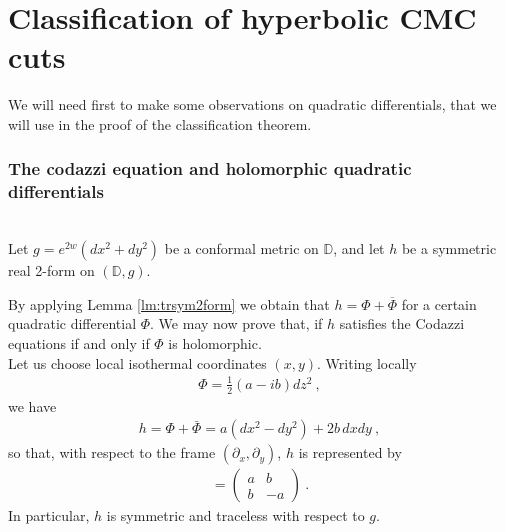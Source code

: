 \documentclass[a4paper,11pt,openright,twoside]{book}
\newcommand{\1}{\mathds{1}}
\theoremstyle{plain}
\theoremstyle{definition}
\theoremstyle{remark}
\begin{document}
\chapter{Classification of hyperbolic CMC cuts}
We will need first to make some observations on quadratic differentials, that we will use in the proof of the classification theorem.
\subsection{The codazzi equation and holomorphic quadratic differentials}\mbox{}\\
Let $g=e^{2w}(dx^2+dy^2)$ be a conformal metric on $\mathbb{D}$, and let $h$ be a symmetric real 2-form on $(\mathbb{D},g)$. 

By applying Lemma \ref{lm:trsym2form} we obtain that $h = \Phi+\overline{\Phi}$ for a certain quadratic differential $\Phi$. We may now prove that, if  $h$ satisfies the Codazzi equations if and only if $\Phi$ is holomorphic.\\

Let us choose local isothermal coordinates $(x,y)$. Writing locally
\begin{align*}
	\Phi = \tfrac{1}{2}(a-ib)dz^2
\ ,
\end{align*}
we have
\begin{align*}
	h=\Phi+\bar\Phi
	=
	a(dx^2-dy^2)+2b\,dxdy
\ ,
\end{align*}
so that, with respect to the frame $(\partial_x,\partial_y)$, $h$ is represented by
\begin{align*}
	[h]=
	\begin{pmatrix}
		a & b\\
		b & -a
	\end{pmatrix}
\ . 
\end{align*}
In particular, $h$ is symmetric and traceless with respect to $g$.\\
\end{document}

